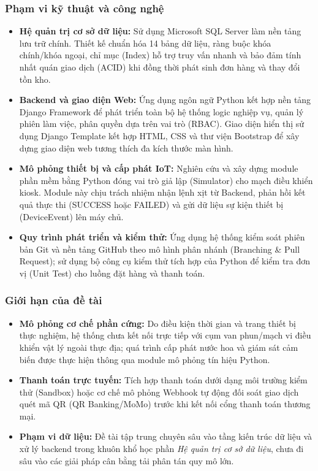 {\subsubsection{Phạm vi kỹ thuật và công nghệ}
\begin{itemize}[leftmargin=1.5cm]
    \item \textbf{Hệ quản trị cơ sở dữ liệu:} Sử dụng Microsoft SQL Server làm nền tảng lưu trữ chính. Thiết kế chuẩn hóa 14 bảng dữ liệu, ràng buộc khóa chính/khóa ngoại, chỉ mục (Index) hỗ trợ truy vấn nhanh và bảo đảm tính nhất quán giao dịch (ACID) khi đồng thời phát sinh đơn hàng và thay đổi tồn kho.
    \item \textbf{Backend và giao diện Web:} Ứng dụng ngôn ngữ Python kết hợp nền tảng Django Framework để phát triển toàn bộ hệ thống logic nghiệp vụ, quản lý phiên làm việc, phân quyền dựa trên vai trò (RBAC). Giao diện hiển thị sử dụng Django Template kết hợp HTML, CSS và thư viện Bootstrap để xây dựng giao diện web tương thích đa kích thước màn hình.
    \item \textbf{Mô phỏng thiết bị và cấp phát IoT:} Nghiên cứu và xây dựng module phần mềm bằng Python đóng vai trò giả lập (Simulator) cho mạch điều khiển kiosk. Module này chịu trách nhiệm nhận lệnh xịt từ Backend, phản hồi kết quả thực thi (SUCCESS hoặc FAILED) và gửi dữ liệu sự kiện thiết bị (DeviceEvent) lên máy chủ.
    \item \textbf{Quy trình phát triển và kiểm thử:} Ứng dụng hệ thống kiểm soát phiên bản Git và nền tảng GitHub theo mô hình phân nhánh (Branching \& Pull Request); sử dụng bộ công cụ kiểm thử tích hợp của Python để kiểm tra đơn vị (Unit Test) cho luồng đặt hàng và thanh toán.
\end{itemize}

\subsubsection{Giới hạn của đề tài}
\begin{itemize}[leftmargin=1.5cm]
    \item \textbf{Mô phỏng cơ chế phần cứng:} Do điều kiện thời gian và trang thiết bị thực nghiệm, hệ thống chưa kết nối trực tiếp với cụm van phun/mạch vi điều khiển vật lý ngoài thực địa; quá trình cấp phát nước hoa và giám sát cảm biến được thực hiện thông qua module mô phỏng tín hiệu Python.
    \item \textbf{Thanh toán trực tuyến:} Tích hợp thanh toán dưới dạng môi trường kiểm thử (Sandbox) hoặc cơ chế mô phỏng Webhook tự động đối soát giao dịch quét mã QR (QR Banking/MoMo) trước khi kết nối cổng thanh toán thương mại.
    \item \textbf{Phạm vi dữ liệu:} Đề tài tập trung chuyên sâu vào tầng kiến trúc dữ liệu và xử lý backend trong khuôn khổ học phần \textit{Hệ quản trị cơ sở dữ liệu}, chưa đi sâu vào các giải pháp cân bằng tải phân tán quy mô lớn.
\end{itemize}

}


